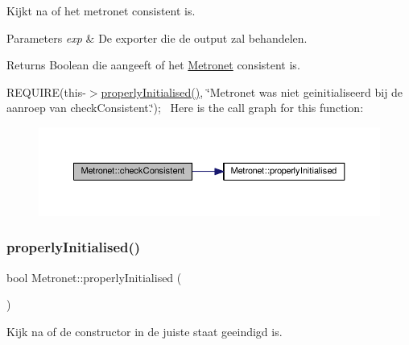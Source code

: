Kijkt na of het metronet consistent is. 


\begin{DoxyParams}{Parameters}
{\em exp} & De exporter die de output zal behandelen. \\
\hline
\end{DoxyParams}
\begin{DoxyReturn}{Returns}
Boolean die aangeeft of het \hyperlink{class_metronet}{Metronet} consistent is.
\end{DoxyReturn}
R\+E\+Q\+U\+I\+RE(this-\/$>$\hyperlink{class_metronet_a3d2adce29a947f162924279b766de645}{properly\+Initialised()}, \char`\"{}\+Metronet was niet geinitialiseerd bij de aanroep van check\+Consistent.\char`\"{});~\newline
Here is the call graph for this function\+:
\nopagebreak
\begin{figure}[H]
\begin{center}
\leavevmode
\includegraphics[width=350pt]{class_metronet_a0128de167ec0a36e70abd57170b3faed_cgraph}
\end{center}
\end{figure}
\mbox{\label{class_metronet_a3d2adce29a947f162924279b766de645}} 
\subsubsection{\texorpdfstring{properly\+Initialised()}{properlyInitialised()}}
{\footnotesize\ttfamily bool Metronet\+::properly\+Initialised (\begin{DoxyParamCaption}{ }\end{DoxyParamCaption})}



Kijk na of de constructor in de juiste staat geeindigd is. 


